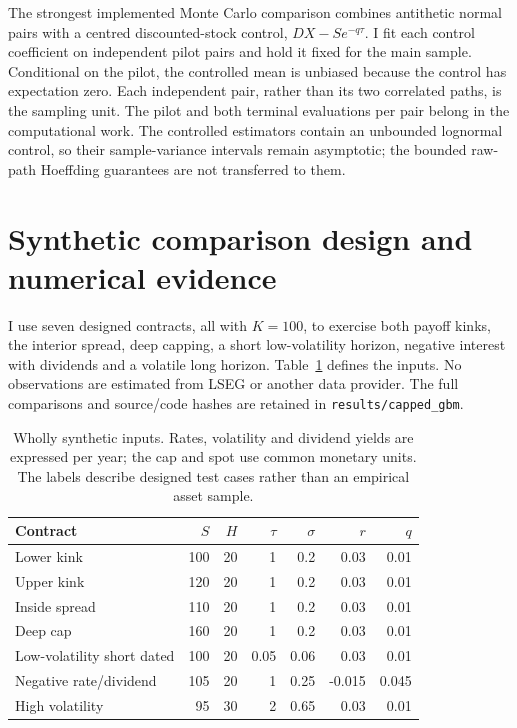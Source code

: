 \documentclass[11pt]{article}
\begin{document}
The strongest implemented Monte Carlo comparison combines antithetic
normal pairs with a centred discounted-stock control,
$D X-S e^{-q\tau}$. I fit each control coefficient on independent pilot
pairs and hold it fixed for the main sample. Conditional on the pilot,
the controlled mean is unbiased because the control has expectation zero.
Each independent pair, rather than its two correlated paths, is the
sampling unit. The pilot and both terminal evaluations per pair belong
in the computational work. The controlled estimators contain an unbounded
lognormal control, so their sample-variance intervals remain asymptotic;
the bounded raw-path Hoeffding guarantees are not transferred to them.

\section{Synthetic comparison design and numerical evidence}
\label{sec:cgbm-results}

I use seven designed contracts, all with $K=100$, to exercise both payoff
kinks, the interior spread, deep capping, a short low-volatility horizon,
negative interest with dividends and a volatile long horizon.
Table~\ref{tab:cgbm-contracts} defines the inputs. No observations are
estimated from LSEG or another data provider. The full comparisons and
source/code hashes are retained in \texttt{results/capped\_gbm}.

\begin{table}[tb]\centering\small
\begin{tabular}{lrrrrrr}\toprule
Contract & $S$ & $H$ & $\tau$ & $\sigma$ & $r$ & $q$\\\midrule
Lower kink & 100 & 20 & 1 & 0.2 & 0.03 & 0.01 \\
Upper kink & 120 & 20 & 1 & 0.2 & 0.03 & 0.01 \\
Inside spread & 110 & 20 & 1 & 0.2 & 0.03 & 0.01 \\
Deep cap & 160 & 20 & 1 & 0.2 & 0.03 & 0.01 \\
Low-volatility short dated & 100 & 20 & 0.05 & 0.06 & 0.03 & 0.01 \\
Negative rate/dividend & 105 & 20 & 1 & 0.25 & -0.015 & 0.045 \\
High volatility & 95 & 30 & 2 & 0.65 & 0.03 & 0.01 \\
\bottomrule\end{tabular}
\caption{Wholly synthetic inputs. Rates, volatility and dividend yields are expressed per year; the cap and spot use common monetary units. The labels describe designed test cases rather than an empirical asset sample.}
\label{tab:cgbm-contracts}\end{table}
\end{document}
